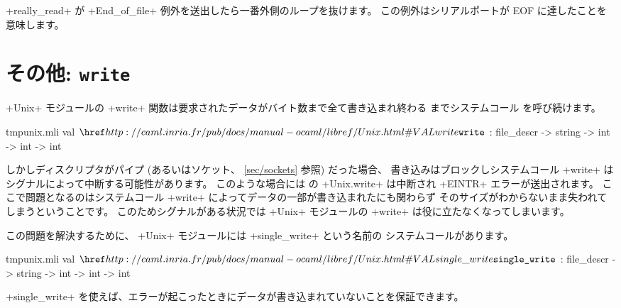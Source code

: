 \begin{example}
\ml+really_read+ が \ml+End_of_file+ 例外を送出したら一番外側のループを抜けます。
この例外はシリアルポートが EOF に達したことを意味します。
\end{example}

\section{\label{single_write}その他: \texttt{write}}

\ml+Unix+ モジュールの \ml+write+ 関数は要求されたデータがバイト数まで全て書き込まれ終わる
までシステムコール  を呼び続けます。
\begin{listingcodefile}{tmpunix.mli}
val $\libvalue{Unix}{write}$ : file_descr -> string -> int -> int -> int
\end{listingcodefile}
%
しかしディスクリプタがパイプ (あるいはソケット、 \ref{sec/sockets} 参照) だった場合、
書き込みはブロックしシステムコール \ml+write+ はシグナルによって中断する可能性があります。
このような場合には \ocaml の \ml+Unix.write+ は中断され \ml+EINTR+ エラーが送出されます。
ここで問題となるのはシステムコール \ml+write+ によってデータの一部が書き込まれたにも関わらず
そのサイズがわからないまま失われてしまうということです。
このためシグナルがある状況では \ml+Unix+ モジュールの \ml+write+ は役に立たなくなってしまいます。

この問題を解決するために、 \ml+Unix+ モジュールには \ml+single_write+ という名前の 
システムコールがあります。
\begin{listingcodefile}{tmpunix.mli}
val $\libvalue{Unix}{single\_write}$ : file_descr -> string -> int -> int -> int
\end{listingcodefile}
\ml+single_write+ を使えば、エラーが起こったときにデータが書き込まれていないことを保証できます。

